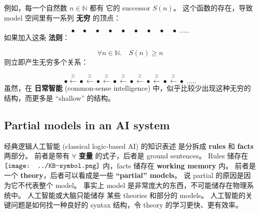 \documentclass[12pt, orivec]{article}
\newcommand{\cc}[2]{#1}
\newcommand{\cc}[2]{#2}
\newcommand*\KB{\vcenter{\hbox{\texttt{[image: ../KB-symbol.png]}}}}
\begin{document}
\cc{例如，每一个自然数 $n \in \mathbb{N}$ 都有 它的 successor $S(n)$。 这个函数的存在，导致 model 空间里有一系列 \textbf{无穷} 的顶点：
}{
For example, each natural number $n \in \mathbb{N}$ has its successor $S(n)$.  The existence of this function results in a series of \textbf{infinite} vertices in the model space:}
\begin{equation}
\bullet \quad \bullet \quad \bullet \quad \bullet \quad \bullet \quad \bullet \quad \bullet \quad \bullet \quad \bullet \; .....
\end{equation}
\cc{如果加入这条 \textbf{法则}：
}{
If we add this \textbf{rule}:}
\begin{equation}
\forall n \in \mathbb{N}. \quad S(n) \ge n
\end{equation}
\cc{则立即产生无穷多个关系：
}{
then it immediately generates an infinite number of relations:}
\begin{equation}
\bullet \stackrel{\ge}{\longleftarrow} \bullet \stackrel{\ge}{\longleftarrow} \bullet \stackrel{\ge}{\longleftarrow} \bullet \stackrel{\ge}{\longleftarrow} \bullet \stackrel{\ge}{\longleftarrow} \bullet \stackrel{\ge}{\longleftarrow} \bullet \stackrel{\ge}{\longleftarrow} \bullet \; .....
\end{equation}
\cc{虽然，在 \textbf{日常智能} (common-sense intelligence) 中，似乎比较少出现这种无穷的结构，而更多是 ``shallow'' 的结构。 
}{
Although, in \textbf{common-sense intelligence}, this kind of infinite structures are rare;  usually their structures are ``shallow''.}

\subsection{Partial models in an AI system}

\cc{经典逻辑人工智能 (classical logic-based AI) 的知识表述 是分拆成 \textbf{rules} 和 \textbf{facts} 两部分。 前者是带有 $\forall$ \textbf{变量} 的式子，后者是 ground sentences。  Rules 储存在 $\KB$ 内，facts 储存在 \textbf{working memory} 内。 前者是一个 \textbf{theory}，后者可以看成是一些 \textbf{``partial'' models}。  说 partial 的原因是因为它不代表整个 model。  事实上 model 是非常庞大的东西，不可能储存在物理系统中。  人工智能或大脑只能储存 某些 theories 和部分的 models。  人工智能的关键问题是如何找一种良好的 syntax 结构，令 theory 的学习更快、更有效率。 
}{
The knowledge representation of classical logic-based AI is split into two parts: \textbf{rules} and \textbf{facts}. The former are the formulas with $\forall$ \textbf{variables}, the latter are ground sentences.  Rules are stored in $\KB$ and facts are stored in \textbf{working memory}. The former is a \textbf{theory}, the latter can be thought of as some \textbf{``partial'' models}. The reason for saying partial is because it does not represent the entire model. In fact, the model is a huge structure that cannot be stored in any physical system.  AI or the brain can only store certain theories and partial models.  The key issue of AI is how to find a good syntax structure to make theory-learning faster and more efficient.}
\end{document}
